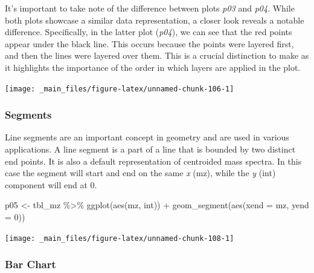 \documentclass[
]{book}
\newenvironment{Shaded}{\begin{snugshade}}{\end{snugshade}}
\newcommand{\AttributeTok}[1]{\textcolor[rgb]{0.77,0.63,0.00}{#1}}
\newcommand{\DecValTok}[1]{\textcolor[rgb]{0.00,0.00,0.81}{#1}}
\newcommand{\FunctionTok}[1]{\textcolor[rgb]{0.00,0.00,0.00}{#1}}
\newcommand{\NormalTok}[1]{#1}
\newcommand{\OtherTok}[1]{\textcolor[rgb]{0.56,0.35,0.01}{#1}}
\newcommand{\SpecialCharTok}[1]{\textcolor[rgb]{0.00,0.00,0.00}{#1}}
\begin{document}
It's important to take note of the difference between plots \emph{p03} and \emph{p04}. While both plots showcase a similar data representation, a closer look reveals a notable difference. Specifically, in the latter plot (\emph{p04}), we can see that the red points appear under the black line. This occurs because the points were layered first, and then the lines were layered over them. This is a crucial distinction to make as it highlights the importance of the order in which layers are applied in the plot.

\begin{center}\texttt{[image: \_main\_files/figure-latex/unnamed-chunk-106-1]} \end{center}

\hypertarget{segments}{%
\subsubsection*{Segments}\label{segments}}

Line segments are an important concept in geometry and are used in various applications. A line segment is a part of a line that is bounded by two distinct end points. It is also a default representation of centroided mass spectra. In this case the segment will start and end on the same \emph{x} (mz), while the \emph{y} (int) component will end at 0.

\begin{Shaded}
\begin{Highlighting}[]
\NormalTok{p05 }\OtherTok{\textless{}{-}}\NormalTok{ tbl\_mz }\SpecialCharTok{\%\textgreater{}\%} 
  \FunctionTok{ggplot}\NormalTok{(}\FunctionTok{aes}\NormalTok{(mz, int)) }\SpecialCharTok{+} 
  \FunctionTok{geom\_segment}\NormalTok{(}\FunctionTok{aes}\NormalTok{(}\AttributeTok{xend =}\NormalTok{ mz, }\AttributeTok{yend =} \DecValTok{0}\NormalTok{))}
\end{Highlighting}
\end{Shaded}

\begin{center}\texttt{[image: \_main\_files/figure-latex/unnamed-chunk-108-1]} \end{center}

\hypertarget{bar-chart}{%
\subsubsection*{Bar Chart}\label{bar-chart}}
\end{document}
